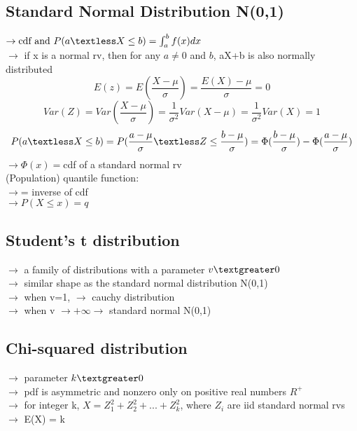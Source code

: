 \documentclass{article}
\begin{document}
\subsection{Standard Normal Distribution N(0,1)}
$\rightarrow \text{cdf and } P(a \textless X \leq b) = \int_a^b f(x)dx$\\
$\rightarrow$ if x is a normal rv, then for any $a\neq0$ and $b$, aX+b is also normally distributed\\
\[E(z) = E(\frac{X-\mu}{\sigma}) = \frac{E(X)-\mu}{\sigma} = 0\]
\[Var(Z) = Var(\frac{X-\mu}{\sigma}) = \frac{1}{\sigma^2}Var(X-\mu) = \frac{1}{\sigma^2}Var(X)=1\]
\[P(a \textless X \leq b) = P(\frac{a-\mu}{\sigma} \textless Z \leq \frac{b-\mu}{\sigma}) = \Phi(\frac{b-\mu}{\sigma})- \Phi(\frac{a-\mu}{\sigma})\]
$\rightarrow \Phi(x)=$cdf of a standard normal rv\\
(Population) quantile function:\\
$\rightarrow$= inverse of cdf\\
$\rightarrow P(X \leq x) =q$
\subsection{Student's t distribution}
$\rightarrow$ a family of distributions with a parameter $v \textgreater 0$\\
$\rightarrow$ similar shape as the standard normal distribution N(0,1)\\
$\rightarrow$ when v=1, $\rightarrow$ cauchy distribution\\
$\rightarrow$ when v $\rightarrow +\infty \rightarrow$ standard normal N(0,1)\\
\subsection{Chi-squared distribution}
$\rightarrow$ parameter $k \textgreater 0$\\
$\rightarrow$ pdf is asymmetric and nonzero only on positive real numbers $R^+$\\
$\rightarrow$ for integer k, $X = Z_1^2 +Z_2^2 +...+Z_k^2$, where $Z_i$ are iid standard normal rvs\\
$\rightarrow$ E(X) = k\\
\end{document}
